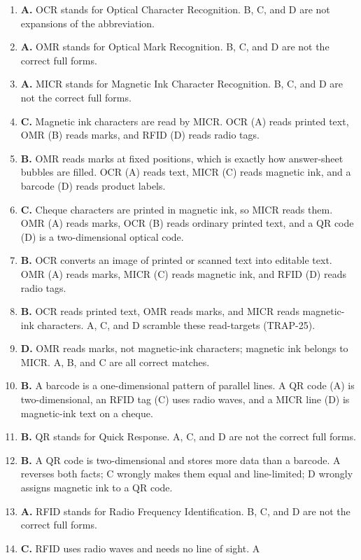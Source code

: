 \begin{enumerate}[label=\textbf{Q\arabic*.}, leftmargin=*]
\item \textbf{A.} OCR stands for Optical Character Recognition. B, C, and D
  are not expansions of the abbreviation.
\item \textbf{A.} OMR stands for Optical Mark Recognition. B, C, and D are
  not the correct full forms.
\item \textbf{A.} MICR stands for Magnetic Ink Character Recognition. B, C,
  and D are not the correct full forms.
\item \textbf{C.} Magnetic ink characters are read by MICR. OCR (A) reads
  printed text, OMR (B) reads marks, and RFID (D) reads radio tags.
\item \textbf{B.} OMR reads marks at fixed positions, which is exactly how
  answer-sheet bubbles are filled. OCR (A) reads text, MICR (C) reads
  magnetic ink, and a barcode (D) reads product labels.
\item \textbf{C.} Cheque characters are printed in magnetic ink, so MICR
  reads them. OMR (A) reads marks, OCR (B) reads ordinary printed text, and
  a QR code (D) is a two-dimensional optical code.
\item \textbf{B.} OCR converts an image of printed or scanned text into
  editable text. OMR (A) reads marks, MICR (C) reads magnetic ink, and RFID
  (D) reads radio tags.
\item \textbf{B.} OCR reads printed text, OMR reads marks, and MICR reads
  magnetic-ink characters. A, C, and D scramble these read-targets
  (TRAP-25).
\item \textbf{D.} OMR reads marks, not magnetic-ink characters; magnetic ink
  belongs to MICR. A, B, and C are all correct matches.
\item \textbf{B.} A barcode is a one-dimensional pattern of parallel lines.
  A QR code (A) is two-dimensional, an RFID tag (C) uses radio waves, and a
  MICR line (D) is magnetic-ink text on a cheque.
\item \textbf{B.} QR stands for Quick Response. A, C, and D are not the
  correct full forms.
\item \textbf{B.} A QR code is two-dimensional and stores more data than a
  barcode. A reverses both facts; C wrongly makes them equal and
  line-limited; D wrongly assigns magnetic ink to a QR code.
\item \textbf{A.} RFID stands for Radio Frequency Identification. B, C, and
  D are not the correct full forms.
\item \textbf{C.} RFID uses radio waves and needs no line of sight. A

\end{enumerate}
